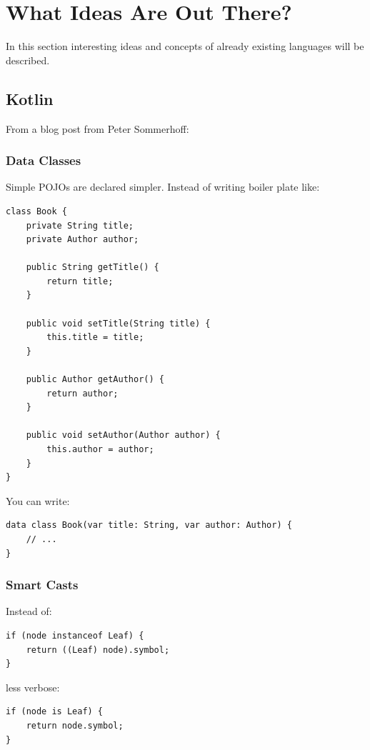 \documentclass[11pt, a4paper]{report}
\begin{document}
\chapter{What Ideas Are Out There?}

In this section interesting ideas and concepts of already existing languages will be described.

\section{Kotlin}

From a blog post from Peter Sommerhoff\cite{kotlin-sommerhoff}:

\subsection{Data Classes}

Simple POJOs are declared simpler. Instead of writing boiler plate like:

\begin{lstlisting}
class Book {
    private String title;
    private Author author;

    public String getTitle() {
        return title;
    }
    
    public void setTitle(String title) {
        this.title = title;
    }

    public Author getAuthor() {
        return author;
    }
    
    public void setAuthor(Author author) {
        this.author = author;
    }
}
\end{lstlisting}

You can write:

\begin{lstlisting}
data class Book(var title: String, var author: Author) {
    // ...
}
\end{lstlisting}

\subsection{Smart Casts}

Instead of:

\begin{lstlisting}
if (node instanceof Leaf) {
    return ((Leaf) node).symbol;
}
\end{lstlisting}

less verbose:

\begin{lstlisting}
if (node is Leaf) {
    return node.symbol;
}
\end{lstlisting}
\end{document}
